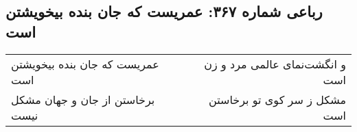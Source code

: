 \begin{center}
\section*{رباعی شماره ۳۶۷: عمریست که جان بنده بیخویشتن است}
\label{sec:0367}
\begin{longtable}{l p{0.5cm} r}
عمریست که جان بنده بیخویشتن است
&&
و انگشت‌نمای عالمی مرد و زن است
\\
برخاستن از جان و جهان مشکل نیست
&&
مشکل ز سر کوی تو برخاستن است
\\
\end{longtable}
\end{center}
